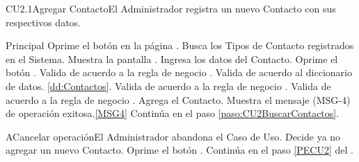	\begin{UseCase}{CU2.1}{Agregar Contacto}{El Administrador registra un nuevo Contacto con sus respectivos datos.}
	\end{UseCase}

	\begin{UCtrayectoria}{Principal}
			\UCpaso[\UCactor] Oprime el botón  en la página .
                        \UCpaso Busca los Tipos de Contacto registrados en el Sistema.
			\UCpaso Muestra la pantalla .
		        \UCpaso [\UCactor] Ingresa los datos del Contacto.\label{paso:CU2ValidacionDatosNuevosContactos} 
                	\UCpaso [\UCactor] Oprime el botón .\label{PECU5}
                        \UCpaso Valida de acuerdo a la regla de negocio .  
                        \UCpaso Valida de acuerdo al diccionario de datos.  \ref{dd:Contactos}. 
                        \UCpaso Valida de acuerdo a la regla de negocio . 
			\UCpaso Valida de acuerdo a la regla de negocio . 
			\UCpaso Agrega el Contacto.
			\UCpaso Muestra el mensaje (MSG-4) de operación exitosa.\ref{MSG4}
			\UCpaso Continúa en el paso \ref{paso:CU2BuscarContactos}.
	\end{UCtrayectoria}

	\begin{UCtrayectoriaA}{A}{Cancelar operación}{El Administrador abandona el Caso de Uso.}
			\UCpaso[\UCactor] Decide ya no agregar un nuevo Contacto.
			\UCpaso[\UCactor] Oprime el botón .
			\UCpaso Continúa en el paso \ref{PECU2} del .
	\end{UCtrayectoriaA}


